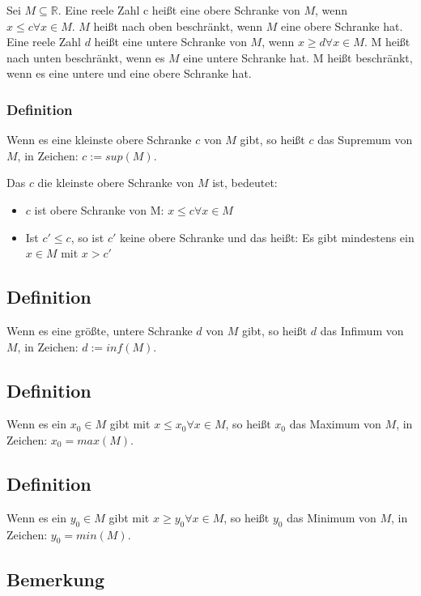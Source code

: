 \documentclass[a4paper,10pt]{article}
\begin{document}
Sei $M \subseteq \mathbb{R}$. Eine reele Zahl c heißt eine obere Schranke von $M$, wenn $x \le c \forall x \in M$.
$M$ heißt nach oben beschränkt, wenn $M$ eine obere Schranke hat.
Eine reele Zahl $d$ heißt eine untere Schranke von $M$, wenn $x \ge d \forall x \in M$.
M heißt nach unten beschränkt, wenn es $M$ eine untere Schranke hat.
M heißt beschränkt, wenn es eine untere und eine obere Schranke hat.

\subsubsection{Definition}

Wenn es eine kleinste obere Schranke $c$ von $M$ gibt, so heißt $c$ das Supremum von $M$, in Zeichen: $c := sup(M)$.

Das $c$ die kleinste obere Schranke von $M$ ist, bedeutet:
\begin{itemize}
 \item $c$ ist obere Schranke von M: $x \le c \forall x \in M$
 \item Ist $c' \le c$, so ist $c'$ keine obere Schranke und das heißt: Es gibt mindestens ein $x \in M$ mit $x > c'$
\end{itemize}

\subsection{Definition}

Wenn es eine größte, untere Schranke $d$ von $M$ gibt, so heißt $d$ das Infimum von $M$, in Zeichen: $d := inf(M)$.

\subsection{Definition}

Wenn es ein $x_0 \in M$ gibt mit $x \le x_0 \forall x \in M$, so heißt $x_0$ das Maximum von $M$, in Zeichen: $x_0 = max(M)$.

\subsection{Definition}

Wenn es ein $y_0 \in M$ gibt mit $x \ge y_0 \forall x \in M$, so heißt $y_0$ das Minimum von $M$, in Zeichen: $y_0 = min(M)$.

\subsection{Bemerkung}
\end{document}
